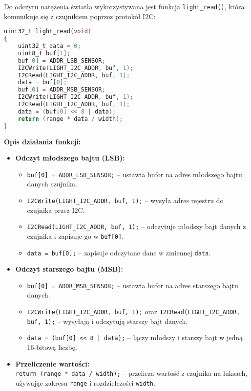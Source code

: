 \documentclass[a4paper,12pt]{report}
\begin{document}
Do odczytu natężenia światła wykorzystywana jest funkcja \texttt{light\_read()}, która komunikuje się z czujnikiem poprzez protokół I2C:

\begin{lstlisting}[language=C]
uint32_t light_read(void)
{
    uint32_t data = 0;
    uint8_t buf[1];
    buf[0] = ADDR_LSB_SENSOR;
    I2CWrite(LIGHT_I2C_ADDR, buf, 1);
    I2CRead(LIGHT_I2C_ADDR, buf, 1);
    data = buf[0];
    buf[0] = ADDR_MSB_SENSOR;
    I2CWrite(LIGHT_I2C_ADDR, buf, 1);
    I2CRead(LIGHT_I2C_ADDR, buf, 1);
    data = (buf[0] << 8 | data);
    return (range * data / width);
}
\end{lstlisting}

\textbf{Opis działania funkcji:}

\begin{itemize}
    \item \textbf{Odczyt młodszego bajtu (LSB):}
    \begin{itemize}
        \item \texttt{buf[0] = ADDR\_LSB\_SENSOR;} – ustawia bufor na adres młodszego bajtu danych czujnika.
        \item \texttt{I2CWrite(LIGHT\_I2C\_ADDR, buf, 1);} – wysyła adres rejestru do czujnika przez I2C.
        \item \texttt{I2CRead(LIGHT\_I2C\_ADDR, buf, 1);} – odczytuje młodszy bajt danych z czujnika i zapisuje go w \texttt{buf[0]}.
        \item \texttt{data = buf[0];} – zapisuje odczytane dane w zmiennej \texttt{data}.
    \end{itemize}

    \item \textbf{Odczyt starszego bajtu (MSB):}
    \begin{itemize}
        \item \texttt{buf[0] = ADDR\_MSB\_SENSOR;} – ustawia bufor na adres starszego bajtu danych.
        \item \texttt{I2CWrite(LIGHT\_I2C\_ADDR, buf, 1);} oraz \texttt{I2CRead(LIGHT\_I2C\_ADDR, buf, 1);} – wysyłają i odczytują starszy bajt danych.
        \item \texttt{data = (buf[0] << 8 | data);} – łączy młodszy i starszy bajt w jedną 16-bitową liczbę.
    \end{itemize}

    \item \textbf{Przeliczenie wartości:} \\
    \texttt{return (range * data / width);} – przelicza wartość z czujnika na luksach, używając zakresu \texttt{range} i rozdzielczości \texttt{width}.
\end{itemize}
\end{document}
